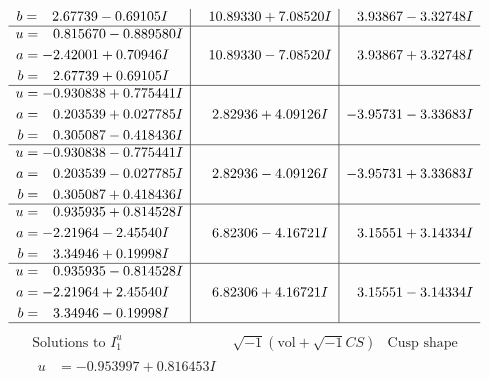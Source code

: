 \documentclass[1p]{elsarticle_modified}
\theoremstyle{definition}
\newcommand{\I}{\sqrt{-1}}
\begin{document}
$$\begin{array}{c|c|c}
\begin{aligned}
b &= \phantom{-}2.67739 - 0.69105 I\end{aligned}
 & \phantom{-}10.89330 + 7.08520 I & \phantom{-}3.93867 - 3.32748 I \\ \hline\begin{aligned}
u &= \phantom{-}0.815670 - 0.889580 I \\
a &= -2.42001 + 0.70946 I \\
b &= \phantom{-}2.67739 + 0.69105 I\end{aligned}
 & \phantom{-}10.89330 - 7.08520 I & \phantom{-}3.93867 + 3.32748 I \\ \hline\begin{aligned}
u &= -0.930838 + 0.775441 I \\
a &= \phantom{-}0.203539 + 0.027785 I \\
b &= \phantom{-}0.305087 - 0.418436 I\end{aligned}
 & \phantom{-}2.82936 + 4.09126 I & -3.95731 - 3.33683 I \\ \hline\begin{aligned}
u &= -0.930838 - 0.775441 I \\
a &= \phantom{-}0.203539 - 0.027785 I \\
b &= \phantom{-}0.305087 + 0.418436 I\end{aligned}
 & \phantom{-}2.82936 - 4.09126 I & -3.95731 + 3.33683 I \\ \hline\begin{aligned}
u &= \phantom{-}0.935935 + 0.814528 I \\
a &= -2.21964 - 2.45540 I \\
b &= \phantom{-}3.34946 + 0.19998 I\end{aligned}
 & \phantom{-}6.82306 - 4.16721 I & \phantom{-}3.15551 + 3.14334 I \\ \hline\begin{aligned}
u &= \phantom{-}0.935935 - 0.814528 I \\
a &= -2.21964 + 2.45540 I \\
b &= \phantom{-}3.34946 - 0.19998 I\end{aligned}
 & \phantom{-}6.82306 + 4.16721 I & \phantom{-}3.15551 - 3.14334 I\\
 \hline 
 \end{array}$$\newpage$$\begin{array}{c|c|c}  
\text{Solutions to }I^u_{1}& \I (\text{vol} + \sqrt{-1}CS) & \text{Cusp shape}\\
 \hline 
\begin{aligned}
u &= -0.953997 + 0.816453 I \\

\end{aligned}
\end{array}$$
\end{document}

